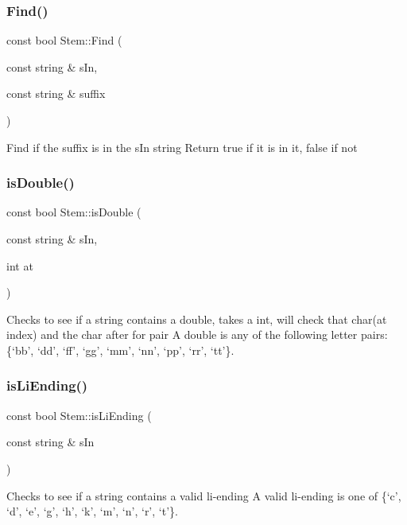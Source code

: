 \subsubsection{\texorpdfstring{Find()}{Find()}}
{\footnotesize\ttfamily const bool Stem\+::\+Find (\begin{DoxyParamCaption}\item[{const string \&}]{s\+In,  }\item[{const string \&}]{suffix }\end{DoxyParamCaption})}

Find if the suffix is in the s\+In string Return true if it is in it, false if not \mbox{\label{class_stem_a0db7a87086d2fc5e88dcc5ccf5c15bde}} 
\subsubsection{\texorpdfstring{is\+Double()}{isDouble()}}
{\footnotesize\ttfamily const bool Stem\+::is\+Double (\begin{DoxyParamCaption}\item[{const string \&}]{s\+In,  }\item[{int}]{at }\end{DoxyParamCaption})}

Checks to see if a string contains a double, takes a int, will check that char(at index) and the char after for pair A double is any of the following letter pairs\+: \{‘bb’, ‘dd’, ‘ff’, ‘gg’, ‘mm’, ‘nn’, ‘pp’, ‘rr’, ‘tt’\}. \mbox{\label{class_stem_ac0cf0f97ff0f65029061ee03bc366874}} 
\subsubsection{\texorpdfstring{is\+Li\+Ending()}{isLiEnding()}}
{\footnotesize\ttfamily const bool Stem\+::is\+Li\+Ending (\begin{DoxyParamCaption}\item[{const string \&}]{s\+In }\end{DoxyParamCaption})}

Checks to see if a string contains a valid li-\/ending A valid li-\/ending is one of \{‘c’, ‘d’, ‘e’, ‘g’, ‘h’, ‘k’, ‘m’, ‘n’, ‘r’, ‘t’\}. \mbox{\label{class_stem_a709f4d5f630b10ef59025a5b3d738a17}} 
